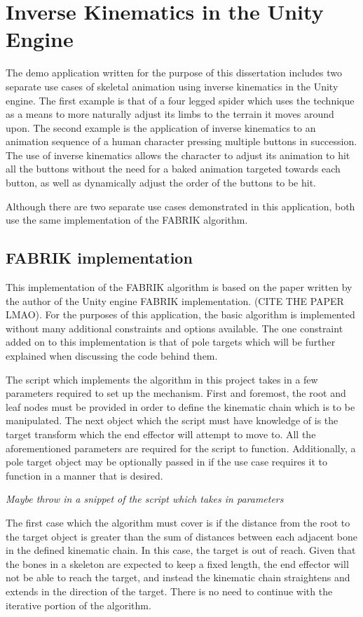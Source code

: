 \chapter{Inverse Kinematics in the Unity Engine} 
The demo application written for the purpose of this dissertation includes two
separate use cases of skeletal animation using inverse kinematics in the Unity
engine. The first example is that of a four legged spider which uses the
technique as a means to more naturally adjust its limbs to the terrain it moves
around upon. The second example is the application of inverse kinematics to an
animation sequence of a human character pressing multiple buttons in succession.
The use of inverse kinematics allows the character to adjust its animation to hit
all the buttons without the need for a baked animation targeted towards each
button, as well as dynamically adjust the order of the buttons to be hit.

Although there are two separate use cases demonstrated in this application, both
use the same implementation of the FABRIK algorithm. 


\section{FABRIK implementation}
This implementation of the FABRIK algorithm is based on the paper written by the
author of the Unity engine FABRIK implementation. (CITE THE PAPER LMAO). For the
purposes of this application, the basic algorithm is implemented without many
additional constraints and options available. The one constraint added on to
this implementation is that of pole targets which will be further explained when
discussing the code behind them.

The script which implements the algorithm in this project takes in a few
parameters required to set up the mechanism. First and foremost, the root and
leaf nodes must be provided in order to define the kinematic chain which is to
be manipulated. The next object which the script must have knowledge of is the
target transform which the end effector will attempt to move to. All the
aforementioned parameters are required for the script to function. Additionally,
a pole target object may be optionally passed in if the use case requires it to
function in a manner that is desired.

\textit{Maybe throw in a snippet of the script which takes in parameters}

The first case which the algorithm must cover is if the distance from the root
to the target object is greater than the sum of distances between each adjacent
bone in the defined kinematic chain. In this case, the target is out of reach. Given
that the bones in a skeleton are expected to keep a fixed length, the end
effector will not be able to reach the target, and instead the kinematic chain
straightens and extends in the direction of the target. There is no need to
continue with the iterative portion of the algorithm.

